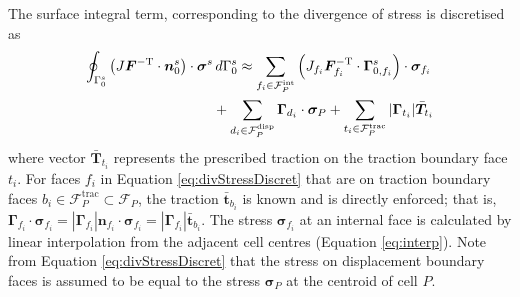 \documentclass[sn-mathphys,Numbered]{sn-jnl}%
\newcommand{\bb}{\boldsymbol}
\begin{document}
The surface integral term, corresponding to the divergence of stress is discretised as
\begin{align} \label{eq:divStressDiscret}
	\oint_{\Gamma_0^s} \left( J \bb{F}^{-\text{T}} \cdot \bb{n}_0^s \right) \cdot \bb{\sigma}^s & \, d\Gamma_0^s
	\approx  \sum_{f_i \in \mathcal{F}_P^{\text{int}}} \left( J_{f_i} \bb{F}^{-\text{T}}_{f_i} \cdot \bb{\Gamma}_{0,f_i}^s \right) \cdot \bb{\sigma}_{f_i} \notag \\
	&+ \sum_{d_i \in \mathcal{F}_P^{\text{disp}}} \bb{\Gamma}_{d_i} \cdot \bb{\sigma}_{P}
	+ \sum_{t_i \in \mathcal{F}_P^{\text{trac}}} |\bb{\Gamma}_{t_i}| \bar{\bb{T}}_{t_i}
\end{align}
where vector $\bar{\bb{T}}_{t_i}$ represents the prescribed traction on the traction boundary face $t_i$.
For faces $f_i$ in Equation \ref{eq:divStressDiscret} that are on traction boundary faces $b_i \in \mathcal{F}_P^{\text{trac}} \subset \mathcal{F}_P$, 
the traction $\bar{\bb{t}}_{b_i}$ is known and is directly enforced; that is, $\bb{\Gamma}_{f_i} \cdot \bb{\sigma}_{f_i} = |\bb{\Gamma}_{f_i}| \bb{n}_{f_i} \cdot \bb{\sigma}_{f_i} =  |\bb{\Gamma}_{f_i}| \bar{\bb{t}}_{b_i}$.
The stress $\bb{\sigma}_{f_i}$ at an internal face is calculated by linear interpolation from the adjacent cell centres (Equation \ref{eq:interp}).
Note from Equation \ref{eq:divStressDiscret} that the stress on displacement boundary faces is assumed to be equal to the stress $\bb{\sigma}_P$ at the centroid of cell $P$.
\end{document}
